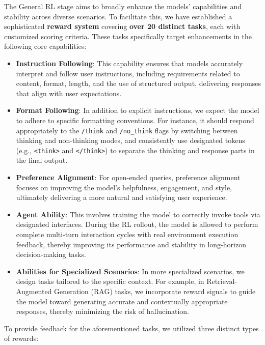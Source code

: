 The General RL stage aims to broadly enhance the models' capabilities and stability across diverse scenarios. To facilitate this, we have established a sophisticated \textbf{reward system} covering \textbf{over 20 distinct tasks}, each with customized scoring criteria. These tasks specifically target enhancements in the following core capabilities:
\begin{itemize}

\item \textbf{Instruction Following}: This capability ensures that models accurately interpret and follow user instructions, including requirements related to content, format, length, and the use of structured output, delivering responses that align with user expectations.

\item \textbf{Format Following}: In addition to explicit instructions, we expect the model to adhere to specific formatting conventions. For instance, it should respond appropriately to the \texttt{/think} and \texttt{/no\_think} flags by switching between thinking and non-thinking modes, and consistently use designated tokens (e.g., \texttt{<think>} and \texttt{</think>}) to separate the thinking and response parts in the final output.

\item \textbf{Preference Alignment}: For open-ended queries, preference alignment focuses on improving the model’s helpfulness, engagement, and style, ultimately delivering a more natural and satisfying user experience.

\item \textbf{Agent Ability}: This involves training the model to correctly invoke tools via designated interfaces. During the RL rollout, the model is allowed to perform complete multi-turn interaction cycles with real environment execution feedback, thereby improving its performance and stability in long-horizon decision-making tasks.

\item \textbf{Abilities for Specialized Scenarios}: In more specialized scenarios, we design tasks tailored to the specific context. For example, in Retrieval-Augmented Generation (RAG) tasks, we incorporate reward signals to guide the model toward generating accurate and contextually appropriate responses, thereby minimizing the risk of hallucination.

\end{itemize}


To provide feedback for the aforementioned tasks, we utilized three distinct types of rewards:

